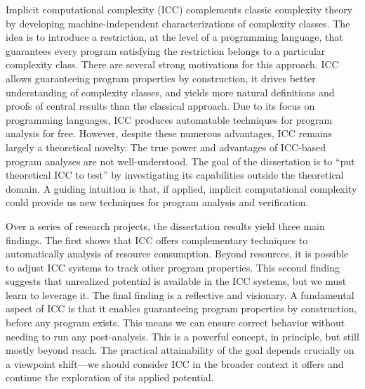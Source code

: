 Implicit computational complexity (ICC) complements classic complexity theory by developing machine-independent characterizations of complexity classes. The idea is to introduce a restriction, at the level of a programming language, that guarantees every program satisfying the restriction belongs to a particular complexity class. There are several strong motivations for this approach. ICC allows guaranteeing program properties by construction, it drives better understanding of complexity classes, and yields more natural definitions and proofs of central results than the classical approach. Due to its focus on programming languages, ICC produces automatable techniques for program analysis for free. However, despite these numerous advantages, ICC remains largely a theoretical novelty. The true power and advantages of ICC-based program analyses are not well-understood. The goal of the dissertation is to ``put theoretical ICC to test'' by investigating its capabilities outside the theoretical domain. A guiding intuition is that, if applied, implicit computational complexity could provide us new techniques for program analysis and verification.

Over a series of research projects, the dissertation results yield three main findings. The first shows that ICC offers complementary techniques to automatically analysis of resource consumption. Beyond resources, it is possible to adjust ICC systems to track other program properties. This second finding suggests that unrealized potential is available in the ICC systems, but we must learn to leverage it. The final finding is a reflective and visionary. A fundamental aspect of ICC is that it enables guaranteeing program properties by construction, before any program exists. This means we can ensure correct behavior without needing to run any post-analysis. This is a powerful concept, in principle, but still mostly beyond reach. The practical attainability of the goal depends crucially on a viewpoint shift---we should consider ICC in the broader context it offers and continue the exploration of its applied potential.